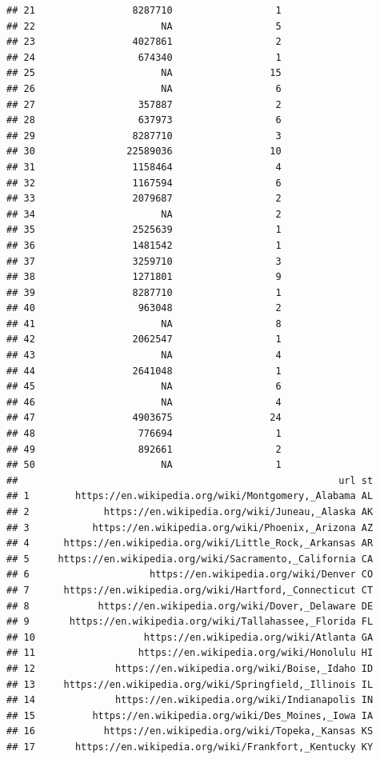 \documentclass[
]{article}
\begin{document}
\begin{verbatim}
## 21                 8287710                  1
## 22                      NA                  5
## 23                 4027861                  2
## 24                  674340                  1
## 25                      NA                 15
## 26                      NA                  6
## 27                  357887                  2
## 28                  637973                  6
## 29                 8287710                  3
## 30                22589036                 10
## 31                 1158464                  4
## 32                 1167594                  6
## 33                 2079687                  2
## 34                      NA                  2
## 35                 2525639                  1
## 36                 1481542                  1
## 37                 3259710                  3
## 38                 1271801                  9
## 39                 8287710                  1
## 40                  963048                  2
## 41                      NA                  8
## 42                 2062547                  1
## 43                      NA                  4
## 44                 2641048                  1
## 45                      NA                  6
## 46                      NA                  4
## 47                 4903675                 24
## 48                  776694                  1
## 49                  892661                  2
## 50                      NA                  1
##                                                        url st
## 1        https://en.wikipedia.org/wiki/Montgomery,_Alabama AL
## 2             https://en.wikipedia.org/wiki/Juneau,_Alaska AK
## 3           https://en.wikipedia.org/wiki/Phoenix,_Arizona AZ
## 4      https://en.wikipedia.org/wiki/Little_Rock,_Arkansas AR
## 5     https://en.wikipedia.org/wiki/Sacramento,_California CA
## 6                     https://en.wikipedia.org/wiki/Denver CO
## 7      https://en.wikipedia.org/wiki/Hartford,_Connecticut CT
## 8            https://en.wikipedia.org/wiki/Dover,_Delaware DE
## 9       https://en.wikipedia.org/wiki/Tallahassee,_Florida FL
## 10                   https://en.wikipedia.org/wiki/Atlanta GA
## 11                  https://en.wikipedia.org/wiki/Honolulu HI
## 12              https://en.wikipedia.org/wiki/Boise,_Idaho ID
## 13     https://en.wikipedia.org/wiki/Springfield,_Illinois IL
## 14              https://en.wikipedia.org/wiki/Indianapolis IN
## 15          https://en.wikipedia.org/wiki/Des_Moines,_Iowa IA
## 16            https://en.wikipedia.org/wiki/Topeka,_Kansas KS
## 17       https://en.wikipedia.org/wiki/Frankfort,_Kentucky KY

\end{verbatim}
\end{document}
